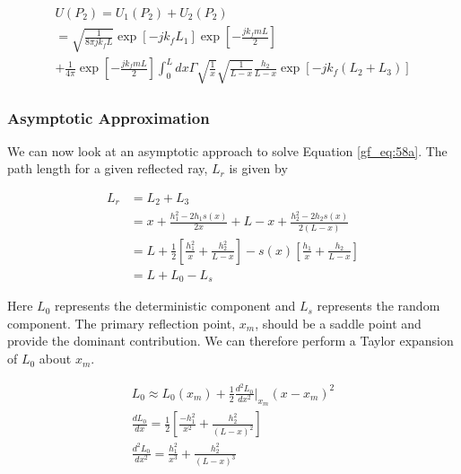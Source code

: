 \begin{equation}
\begin{gathered}
U(P_2) = U_1(P_2) + U_2(P_2)\\
= \sqrt{\frac{1}{8\pi jk_fL}}\exp\left[-jk_fL_1\right]\exp\left[-\frac{jk_fmL}{2}\right] \\
+ \frac{1}{4\pi}\exp\left[-\frac{jk_fmL}{2}\right]\int_0^L dx \Gamma \sqrt{\frac{1}{x}}\sqrt{\frac{1}{L-x}}\frac{h_2}{L-x}\exp\left[-jk_f\left(L_2+L_3\right) \right]
\label{gf_eq:58a}
\end{gathered}
\end{equation}
\renewcommand{\baselinestretch}{2} \small\normalsize

\subsubsection{Asymptotic Approximation}
We can now look at an asymptotic approach to solve Equation \ref{gf_eq:58a}. The path length for a given reflected ray, $L_r$ is given by

\begin{equation}
\begin{aligned}
L_r &= L_2 + L_3 \\
& = x + \frac{h_1^2-2h_1s(x)}{2x} +  L-x + \frac{h_2^2 - 2h_2s(x)}{2\left(L-x\right)} \\
& = L + \frac{1}{2}\left[\frac{h_1^2}{x} + \frac{h_2^2}{L-x} \right] - s(x)\left[ \frac{h_1}{x} + \frac{h_2}{L-x}\right] \\
&= L + L_0 - L_s
\end{aligned}
\label{gf_eq:60}
\end{equation}
\renewcommand{\baselinestretch}{2} \small\normalsize

Here $L_0$ represents the deterministic component and $L_s$ represents the random component. The primary reflection point, $x_m$, should be a saddle point and provide the dominant contribution. We can therefore perform a Taylor expansion of $L_0$ about $x_m$.

\begin{equation}
\begin{gathered}
\label{gf_eq:61}
L_0 \approx L_0(x_m) + \frac{1}{2}\frac{d^2L_0}{dx^2}\bigg|_{x_m}(x-x_m)^2 \\
\frac{dL_0}{dx} = \frac{1}{2}\left[\frac{-h_1^2}{x^2} + \frac{h_2^2}{(L-x)^2} \right]\\
\frac{d^2L_0}{dx^2} = \frac{h_1^2}{x^3} + \frac{h_2^2}{(L-x)^3} 
\end{gathered}
\end{equation}
\renewcommand{\baselinestretch}{2} \small\normalsize

